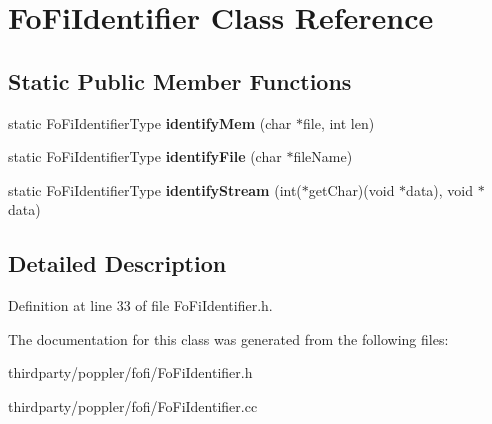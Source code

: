\hypertarget{class_fo_fi_identifier}{}\section{Fo\+Fi\+Identifier Class Reference}
\label{class_fo_fi_identifier}
\subsection*{Static Public Member Functions}
\begin{DoxyCompactItemize}
\item 
\mbox{\label{class_fo_fi_identifier_a22490e7f3f78fa6c8ed1d8cdaacc10da}} 
static Fo\+Fi\+Identifier\+Type {\bfseries identify\+Mem} (char $\ast$file, int len)
\item 
\mbox{\label{class_fo_fi_identifier_aef5fd05db2d887cb6c8187c837d18a8c}} 
static Fo\+Fi\+Identifier\+Type {\bfseries identify\+File} (char $\ast$file\+Name)
\item 
\mbox{\label{class_fo_fi_identifier_abc13b5cb4598c4d1d5e0014e6386e544}} 
static Fo\+Fi\+Identifier\+Type {\bfseries identify\+Stream} (int($\ast$get\+Char)(void $\ast$data), void $\ast$data)
\end{DoxyCompactItemize}


\subsection{Detailed Description}


Definition at line 33 of file Fo\+Fi\+Identifier.\+h.



The documentation for this class was generated from the following files\+:\begin{DoxyCompactItemize}
\item 
thirdparty/poppler/fofi/Fo\+Fi\+Identifier.\+h\item 
thirdparty/poppler/fofi/Fo\+Fi\+Identifier.\+cc\end{DoxyCompactItemize}
